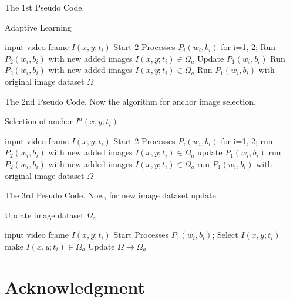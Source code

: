 \documentclass[conference]{IEEEtran}
\begin{document}
The 1st Pseudo Code. 

\begin{algorithm}
\caption{Adaptive Learning}
\begin{algorithmic}
\REQUIRE input video frame $I(x,y;t_i)$  
\ENSURE Start 2 Processes $P_i(w_i,b_i)$ for i=1, 2; 
\STATE Run $P_2(w_i,b_i)$ with new added images $I(x,y;t_i) \in {\Omega}_a$ 
\STATE Update $P_1(w_i,b_i)$ 
\ELSE
\STATE Run $P_2(w_i,b_i)$ with new added images $I(x,y;t_i) \in {\Omega}_a$ 
\ENDIF
\ELSE
\STATE Run $P_1(w_i,b_i)$ with original image dataset $\Omega$ 
\ENDIF
\ENDWHILE
\end{algorithmic}
\end{algorithm}

The 2nd Pseudo Code. 
Now the algorithm for anchor image selection. 

\begin{algorithm}
\caption{Selection of anchor $I^a(x,y;t_i)$}
\begin{algorithmic}
\REQUIRE input video frame $I(x,y;t_i)$  
\ENSURE Start 2 Processes $P_i(w_i,b_i)$ for i=1, 2; 
\STATE run $P_2(w_i,b_i)$ with new added images $I(x,y;t_i) \in {\Omega}_a$ 
\STATE update $P_1(w_i,b_i)$ 
\ELSE
\STATE run $P_2(w_i,b_i)$ with new added images $I(x,y;t_i) \in {\Omega}_a$ 
\ENDIF
\ELSE
\STATE run $P_1(w_i,b_i)$ with original image dataset $\Omega$ 
\ENDIF
\ENDWHILE
\end{algorithmic}
\end{algorithm}

The 3rd Pesudo Code. 
Now, for new image dataset update

\begin{algorithm}
\caption{Update image dataset ${\Omega}_a$}
\begin{algorithmic}
\REQUIRE input video frame $I(x,y;t_i)$  
\ENSURE Start Processes $P_1(w_i,b_i)$; 
\STATE Select $I(x,y;t_i)$ make $ I(x,y;t_i) \in {\Omega}_a$ 
\STATE Update $\Omega \rightarrow {\Omega}_a$ 
\ENDIF
\ENDWHILE
\end{algorithmic}
\end{algorithm}

 

\section*{Acknowledgment}
\end{document}
